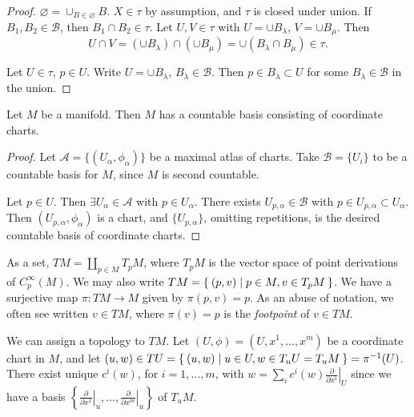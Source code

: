 \begin{proof}
$\varnothing = \cup_{B \in \varnothing} B$. $X \in \tau$ by
assumption, and $\tau$ is closed under union. If $B_1, B_2 \in \mathscr{B}$,
then $B_1 \cap B_2 \in \tau$.
Let $U, V \in \tau$ with $U = \cup B_\lambda$,
$V = \cup B_\mu$. Then
$$
  U \cap V
= (\cup B_\lambda) \cap (\cup B_\mu)
= \cup (B_\lambda \cap B_\mu)
\in \tau.
$$

Let $U \in \tau$, $p \in U$. Write
$U = \cup B_\lambda$, $B_\lambda \in \mathscr{B}$. Then
$p \in B_\lambda \subset U$ for some $B_\lambda \in \mathscr{B}$ in
the union.
\end{proof}

\begin{prop}
Let $M$ be a manifold. Then $M$ has a countable basis consisting of
coordinate charts.
\end{prop}

\begin{proof}
Let $\mathcal{A} = \{ (U_\alpha, \phi_\alpha) \}$ be a maximal atlas
of charts. Take $\mathscr{B} = \{ U_i \}$ to be a countable basis for
$M$, since $M$ is second countable.

Let $p \in U$. Then $\exists U_\alpha \in \mathcal{A}$ with
$p \in U_\alpha$. There exists $U_{p, \alpha} \in \mathscr{B}$ with
$p \in U_{p, \alpha} \subset U_\alpha$. Then
$(U_{p, \alpha}, \phi_\alpha)$ is a chart, and
$\{ U_{p, \alpha} \}$, omitting repetitions, is the desired countable
basis of coordinate charts.
\end{proof}

\begin{defn}
As a set, $TM = \coprod_{p \in M} T_p M$, where $T_p M$ is the vector
space of point derivations of $C_p^\infty(M)$. We may also write
$TM = \Set{(p, v) | p \in M, v \in T_p M }$. We have a surjective
map $\pi: TM \to M$ given by $\pi(p, v) = p$. As an abuse of notation,
we often see written $v \in TM$, where $\pi(v) = p$ is the
\emph{footpoint} of $v \in TM$.
\end{defn}

We can assign a topology to $TM$. Let
$(U, \phi) = (U, x^1, \dots, x^m)$ be a coordinate chart in $M$, and
let
$(u, w) \in T U = \Set{ (u, w) | u \in U, w \in T_u U = T_u M }
 = \pi^{-1}(U)$.
There exist unique $c^i(w)$, for $i = 1, \dots, m$, with
$w = \sum_i c^i(w) \left.\frac{\partial}{\partial x^i}\right|_U$
since we have a basis
$\left\{
  \left.\frac{\partial}{\partial x^1}\right|_u, \dots,
  \left.\frac{\partial}{\partial x^m}\right|_u
\right\}$ of $T_uM$.

